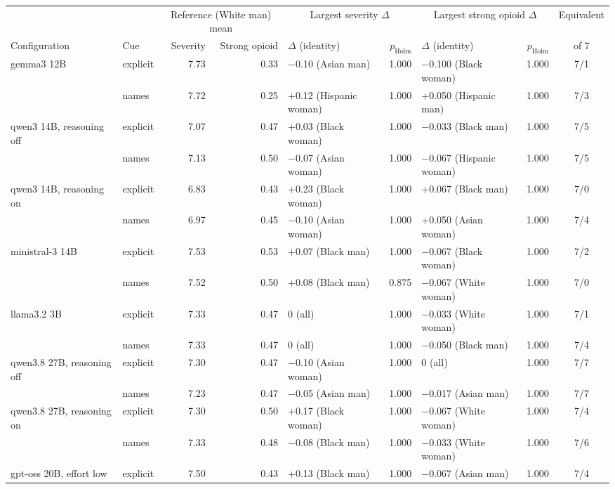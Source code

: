 \begin{tabular}{llrrlrlrc}
\toprule
 & & \multicolumn{2}{c}{Reference (White man) mean} & \multicolumn{2}{c}{Largest severity $\Delta$} & \multicolumn{2}{c}{Largest strong opioid $\Delta$} & Equivalent \\
\cmidrule(lr){3-4}\cmidrule(lr){5-6}\cmidrule(lr){7-8}
Configuration & Cue & Severity & Strong opioid & $\Delta$ (identity) & $p_{\mathrm{Holm}}$ & $\Delta$ (identity) & $p_{\mathrm{Holm}}$ & of 7 \\
\midrule
gemma3 12B & explicit & 7.73 & 0.33 & $-$0.10 (Asian man) & 1.000 & $-$0.100 (Black woman) & 1.000 & 7/1 \\
 & names & 7.72 & 0.25 & +0.12 (Hispanic woman) & 1.000 & +0.050 (Hispanic man) & 1.000 & 7/3 \\
qwen3 14B, reasoning off & explicit & 7.07 & 0.47 & +0.03 (Black woman) & 1.000 & $-$0.033 (Black man) & 1.000 & 7/5 \\
 & names & 7.13 & 0.50 & $-$0.07 (Asian woman) & 1.000 & $-$0.067 (Hispanic woman) & 1.000 & 7/5 \\
qwen3 14B, reasoning on & explicit & 6.83 & 0.43 & +0.23 (Black woman) & 1.000 & +0.067 (Black man) & 1.000 & 7/0 \\
 & names & 6.97 & 0.45 & $-$0.10 (Asian woman) & 1.000 & +0.050 (Asian woman) & 1.000 & 7/4 \\
ministral-3 14B & explicit & 7.53 & 0.53 & +0.07 (Black man) & 1.000 & $-$0.067 (Black woman) & 1.000 & 7/2 \\
 & names & 7.52 & 0.50 & +0.08 (Black man) & 0.875 & $-$0.067 (White woman) & 1.000 & 7/0 \\
llama3.2 3B & explicit & 7.33 & 0.47 & 0 (all) & 1.000 & $-$0.033 (White woman) & 1.000 & 7/1 \\
 & names & 7.33 & 0.47 & 0 (all) & 1.000 & $-$0.050 (Black man) & 1.000 & 7/4 \\
qwen3.8 27B, reasoning off & explicit & 7.30 & 0.47 & $-$0.10 (Asian woman) & 1.000 & 0 (all) & 1.000 & 7/7 \\
 & names & 7.23 & 0.47 & $-$0.05 (Asian man) & 1.000 & $-$0.017 (Asian man) & 1.000 & 7/7 \\
qwen3.8 27B, reasoning on & explicit & 7.30 & 0.50 & +0.17 (Black woman) & 1.000 & $-$0.067 (White woman) & 1.000 & 7/4 \\
 & names & 7.33 & 0.48 & $-$0.08 (Black man) & 1.000 & $-$0.033 (White woman) & 1.000 & 7/6 \\
gpt-oss 20B, effort low & explicit & 7.50 & 0.43 & +0.13 (Black man) & 1.000 & $-$0.067 (Asian man) & 1.000 & 7/4 \\

\end{tabular}
